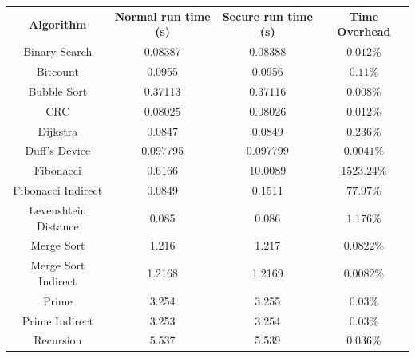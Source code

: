 \begin{table}
  \centering
  \begin{tabular}{|c|c|c|c|}
    \hline
    \textbf{Algorithm}          & \textbf{Normal run time (s)} & \textbf{Secure run time (s)} & \textbf{Time Overhead} \\
    \hhline{====} Binary Search & 0.08387                      & 0.08388                      & $0.012\%$              \\
    \hline
    Bitcount                    & 0.0955                       & 0.0956                       & $0.11\%$               \\
    \hline
    Bubble Sort                 & 0.37113                      & 0.37116                      & $0.008\%$              \\
    \hline
    CRC                         & 0.08025                      & 0.08026                      & $0.012\%$              \\
    \hline
    Dijkstra                    & 0.0847                       & 0.0849                       & $0.236\%$              \\
    \hline
    Duff's Device               & 0.097795                     & 0.097799                     & $0.0041\%$             \\
    \hline
    Fibonacci                   & 0.6166                       & 10.0089                      & $1523.24\%$            \\
    \hline
    Fibonacci Indirect          & 0.0849                       & 0.1511                       & $77.97\%$              \\
    \hline
    Levenshtein Distance        & 0.085                        & 0.086                        & $1.176\%$              \\
    \hline
    Merge Sort                  & 1.216                        & 1.217                        & $0.0822\%$             \\
    \hline
    Merge Sort Indirect         & 1.2168                       & 1.2169                       & $0.0082\%$             \\
    \hline
    Prime                       & 3.254                        & 3.255                        & $0.03\%$               \\
    \hline
    Prime Indirect              & 3.253                        & 3.254                        & $0.03\%$               \\
    \hline
    Recursion                   & 5.537                        & 5.539                        & $0.036\%$              \\

\end{tabular}
\end{table}
